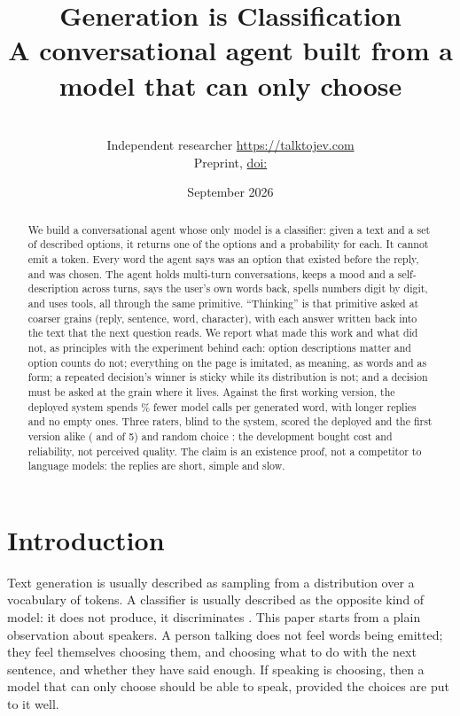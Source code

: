 \documentclass[10pt,twocolumn]{article}
\title{\textbf{Generation is Classification}\\[4pt]
\large A conversational agent built from a model that can only choose}
\author{\\ \small Independent researcher \quad \small\url{https://talktojev.com}\\
\small Preprint, \href{https://doi.org/\PaperDOI}{doi:\PaperDOI}}
\date{September 2026}
\begin{document}
\maketitle

\begin{abstract}
We build a conversational agent whose only model is a classifier: given a text and a set of
described options, it returns one of the options and a probability for each. It cannot emit a token.
Every word the agent says was an option that existed before the reply, and was chosen. The agent
holds multi-turn conversations, keeps a mood and a self-description across turns, says the user's
own words back, spells numbers digit by digit, and uses tools, all through the same primitive.
``Thinking'' is that primitive asked at coarser grains (reply, sentence, word, character), with each
answer written back into the text that the next question reads. We report what made this work and
what did not, as principles with the experiment behind each: option descriptions matter and option
counts do not; everything on the page is imitated, as meaning, as words and as form; a repeated
decision's winner is sticky while its distribution is not; and a decision must be asked at the grain
where it lives. Against the first working version, the deployed system spends \DepCPWDrop\% fewer model
calls per generated word, with longer replies and no empty ones. Three raters, blind to the system,
scored the deployed and the first version alike (\HumanDepMean{} and \HumanBaseMean{} of 5) and random
choice \HumanRandMean{}: the development bought cost and reliability, not perceived quality. The claim
is an existence proof, not a competitor to language models: the replies are short, simple and slow.
\end{abstract}

\section{Introduction}

Text generation is usually described as sampling from a distribution over a vocabulary of tokens. A
classifier is usually described as the opposite kind of model: it does not produce, it discriminates
\citep{ng2001discriminative}. This paper starts from a plain observation about speakers. A person
talking does not feel words being emitted; they feel themselves choosing them, and choosing what to
do with the next sentence, and whether they have said enough. If speaking is choosing, then a model
that can only choose should be able to speak, provided the choices are put to it well.
\end{document}
